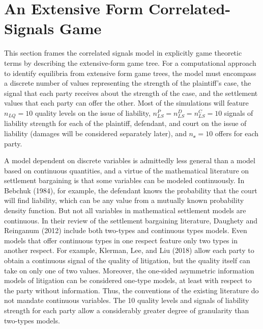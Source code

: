 \documentclass{article}
\begin{document}
\section{An Extensive Form Correlated-Signals Game}

This section frames the correlated signals model in explicitly game theoretic terms by describing the extensive-form game tree. For a computational approach to identify equilibria from extensive form game trees, the model must encompass a discrete number of values representing the strength of the plaintiff's case, the signal that each party receives about the strength of the case, and the settlement values that each party can offer the other. Most of the simulations will feature $n_{LQ}=10$ quality levels on the issue of liability, $n_{LS}^P=n_{LS}^D=n_{LS}^C=10$ signals of liability strength for each of the plaintiff, defendant, and court on the issue of liability (damages will be considered separately later), and  $n_{\mathcal{o}}=10$ offers for each party. 

A model dependent on discrete variables is admittedly less general than a model based on continuous quantities, and a virtue of the mathematical literature on settlement bargaining is that some variables can be modeled continuously. In Bebchuk (1984), for example, the defendant knows the probability that the court will find liability, which can be any value from a mutually known probability density function. But not all variables in mathematical settlement models are continuous. In their review of the settlement bargaining literature, Daughety and Reinganum (2012) \cite{daughetyreinganum2012} include both two-types and continuous types models. Even models that offer continuous types in one respect feature only two types in another respect. For example, Klerman, Lee, and Liu (2018) \cite{klermanleeliu} allow each party to obtain a continuous signal of the quality of litigation, but the quality itself can take on only one of two values. Moreover, the one-sided asymmetric information models of litigation can be considered one-type models, at least with respect to the party without information.  Thus, the conventions of the existing literature do not mandate continuous variables. The 10 quality levels and signals of liability strength for each party allow a considerably greater degree of granularity than two-types models. 
\end{document}
